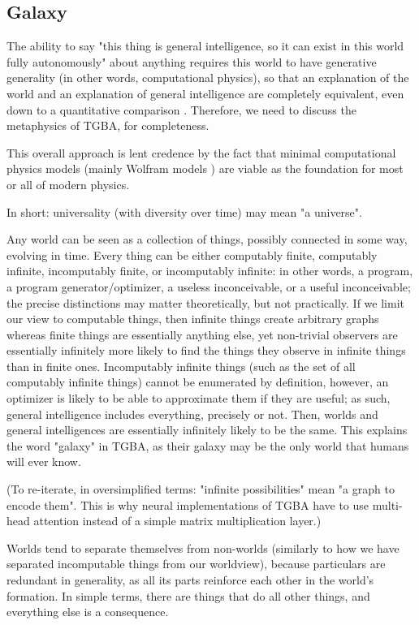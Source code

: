 \documentclass{article}
\begin{document}
\subsection{Galaxy}

The ability to say "this thing is general intelligence, so it can exist in this world fully autonomously" about anything requires this world to have generative generality (in other words, computational physics), so that an explanation of the world and an explanation of general intelligence are completely equivalent, even down to a quantitative comparison \cite{10.3389/fphy.2020.525731}. Therefore, we need to discuss the metaphysics of TGBA, for completeness.

This overall approach is lent credence by the fact that minimal computational physics models (mainly Wolfram models \cite{Wolfram_2020}) are viable as the foundation for most or all of modern physics.

In short: universality (with diversity over time) may mean "a universe".

Any world can be seen as a collection of things, possibly connected in some way, evolving in time. Every thing can be either computably finite, computably infinite, incomputably finite, or incomputably infinite: in other words, a program, a program generator/optimizer, a useless inconceivable, or a useful inconceivable; the precise distinctions may matter theoretically, but not practically. If we limit our view to computable things, then infinite things create arbitrary graphs whereas finite things are essentially anything else, yet non-trivial observers are essentially infinitely more likely to find the things they observe in infinite things than in finite ones. Incomputably infinite things (such as the set of all computably infinite things) cannot be enumerated by definition, however, an optimizer is likely to be able to approximate them if they are useful; as such, general intelligence includes everything, precisely or not. Then, worlds and general intelligences are essentially infinitely likely to be the same. This explains the word "galaxy" in TGBA, as their galaxy may be the only world that humans will ever know.

(To re-iterate, in oversimplified terms: "infinite possibilities" mean "a graph to encode them". This is why neural implementations of TGBA have to use multi-head attention instead of a simple matrix multiplication layer.)

Worlds tend to separate themselves from non-worlds (similarly to how we have separated incomputable things from our worldview), because particulars are redundant in generality, as all its parts reinforce each other in the world's formation. In simple terms, there are things that do all other things, and everything else is a consequence.
\end{document}
